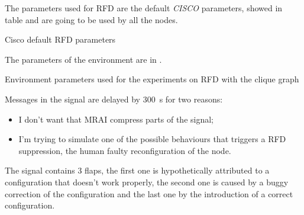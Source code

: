 The parameters used for \ac{RFD} are the default \textit{CISCO} parameters,
showed in table  and are going to be used by
all the nodes.

\begin{table}[h]
	
	\caption{Cisco default \ac{RFD} parameters}
	\label{tbl:cisco_rfd}
\end{table}

The parameters of the environment are in .

\begin{table}[h]
	
	\caption{Environment parameters used for the experiments on \ac{RFD}
		with the clique graph}
	\label{tbl:clique_rfd_params}
\end{table}

Messages in the signal are delayed by \SI{300}{\second} for two reasons:
\begin{itemize}
    \item I don't want that \ac{MRAI} compress parts of the signal;
	\item I'm trying to simulate one of the possible behaviours that triggers a
		\ac{RFD} suppression, the human faulty reconfiguration of the node.
\end{itemize}
The signal contains \num{3} flaps, the first one is hypothetically attributed
to a configuration that doesn't work properly, the second one is caused by a
buggy correction of the configuration and the last one by the introduction of a
correct configuration.


